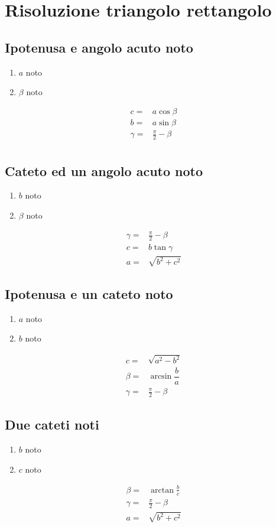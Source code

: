 \section{Risoluzione triangolo rettangolo}
\begin{center}
	
\end{center}
\subsection{Ipotenusa e angolo acuto noto}
\begin{enumerate}
	\item $a$ noto
	\item $\beta$ noto
\end{enumerate}
\begin{align*}
c=&a\cos\beta\\
b=&a\sin\beta\\
\gamma=&\frac{\pi}{2}-\beta\\
\end{align*}
\subsection{Cateto ed un angolo acuto noto}
\begin{enumerate}
	\item $b$ noto
	\item $\beta$ noto
\end{enumerate}
\begin{align*}
\gamma=&\frac{\pi}{2}-\beta\\
c=&b\tan\gamma\\
a=&\sqrt{b^2+c^2}
\end{align*}
\subsection{Ipotenusa e un cateto noto}
\begin{enumerate}
	\item $a$ noto
	\item $b$ noto
\end{enumerate}
\begin{align*}
c=&\sqrt{a^2-b^2}\\
\beta=&\arcsin\dfrac{b}{a}\\
\gamma=&\frac{\pi}{2}-\beta
\end{align*}
\subsection{Due cateti noti}
\begin{enumerate}
	\item $b$ noto
	\item $c$ noto
\end{enumerate}
\begin{align*}
\beta=&\arctan\frac{b}{c}\\
\gamma=&\frac{\pi}{2}-\beta\\
a=&\sqrt{b^2+c^2}
\end{align*}